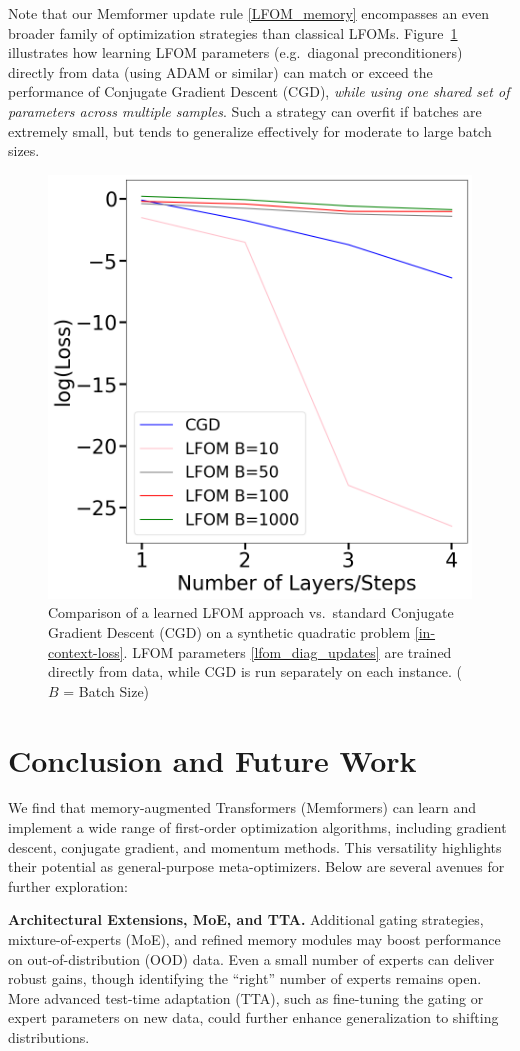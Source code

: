 \documentclass[11pt]{article}
\theoremstyle{plain}
\theoremstyle{definition}
\theoremstyle{remark}
\numberwithin{equation}{section}
\begin{document}
Note that our Memformer update rule \eqref{LFOM_memory} encompasses an even broader family of optimization strategies than classical LFOMs. Figure~\ref{fig:ExtractedLFOMvsCGD} illustrates how learning LFOM parameters (e.g.\ diagonal preconditioners) directly from data (using ADAM or similar) can match or exceed the performance of Conjugate Gradient Descent (CGD), \emph{while using one shared set of parameters across multiple samples}. Such a strategy can overfit if batches are extremely small, but tends to generalize effectively for moderate to large batch sizes.
\begin{figure}
    \centering
    \includegraphics[width=0.7\linewidth]{ExtractedLFOMvsCGD.png}
    \caption{Comparison of a learned LFOM approach vs.\ standard Conjugate Gradient Descent (CGD) on a synthetic quadratic problem \eqref{in-context-loss}. LFOM parameters \eqref{lfom_diag_updates} are trained directly from data, while CGD is run separately on each instance. (\(B\) = Batch Size)}
    \label{fig:ExtractedLFOMvsCGD}
\end{figure}
\section{Conclusion and Future Work}

We find that memory-augmented Transformers (Memformers) can learn and implement a wide range of first-order optimization algorithms, including gradient descent, conjugate gradient, and momentum methods. This versatility highlights their potential as general-purpose meta-optimizers. Below are several avenues for further exploration:

\textbf{Architectural Extensions, MoE, and TTA.}
Additional gating strategies, mixture-of-experts (MoE), and refined memory modules may boost performance on out-of-distribution (OOD) data. Even a small number of experts can deliver robust gains, though identifying the “right” number of experts remains open. More advanced test-time adaptation (TTA), such as fine-tuning the gating or expert parameters on new data, could further enhance generalization to shifting distributions.
\end{document}

